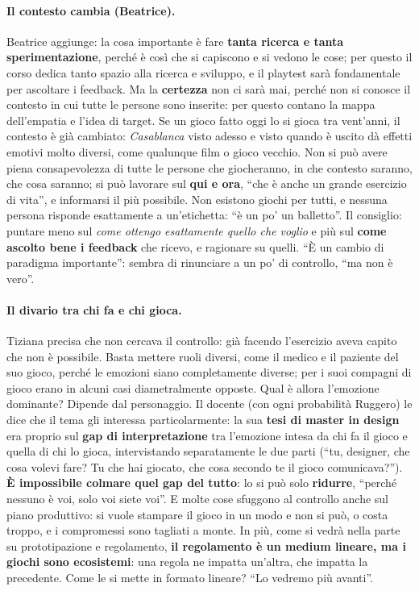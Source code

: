 \paragraph{Il contesto cambia (Beatrice).} Beatrice aggiunge: la cosa importante è
fare \textbf{tanta ricerca e tanta sperimentazione}, perché è così che si capiscono e
si vedono le cose; per questo il corso dedica tanto spazio alla ricerca e sviluppo, e il
playtest sarà fondamentale per ascoltare i feedback. Ma la \textbf{certezza} non ci
sarà mai, perché non si conosce il contesto in cui tutte le persone sono inserite: per
questo contano la mappa dell'empatia e l'idea di target. Se un gioco fatto oggi lo si
gioca tra vent'anni, il contesto è già cambiato: \emph{Casablanca} visto adesso e visto
quando è uscito dà effetti emotivi molto diversi, come qualunque film o gioco vecchio.
Non si può avere piena consapevolezza di tutte le persone che giocheranno, in che
contesto saranno, che cosa saranno; si può lavorare sul \textbf{qui e ora}, ``che è
anche un grande esercizio di vita'', e informarsi il più possibile. Non esistono giochi
per tutti, e nessuna persona risponde esattamente a un'etichetta: ``è un po' un
balletto''. Il consiglio: puntare meno sul \emph{come ottengo esattamente quello che
voglio} e più sul \textbf{come ascolto bene i feedback} che ricevo, e ragionare su
quelli. ``È un cambio di paradigma importante'': sembra di rinunciare a un po' di
controllo, ``ma non è vero''.

\paragraph{Il divario tra chi fa e chi gioca.} Tiziana precisa che non cercava il
controllo: già facendo l'esercizio aveva capito che non è possibile. Basta mettere
ruoli diversi, come il medico e il paziente del suo gioco, perché le emozioni siano
completamente diverse; per i suoi compagni di gioco erano in alcuni casi
diametralmente opposte. Qual è allora l'emozione dominante? Dipende dal personaggio.
Il docente (con ogni probabilità Ruggero) le dice che il tema gli interessa
particolarmente: la sua \textbf{tesi di master in design} era proprio sul \textbf{gap
di interpretazione} tra l'emozione intesa da chi fa il gioco e quella di chi lo gioca,
intervistando separatamente le due parti (``tu, designer, che cosa volevi fare? Tu che
hai giocato, che cosa secondo te il gioco comunicava?''). \textbf{È impossibile colmare
quel gap del tutto}: lo si può solo \textbf{ridurre}, ``perché nessuno è voi, solo voi
siete voi''. E molte cose sfuggono al controllo anche sul piano produttivo: si vuole
stampare il gioco in un modo e non si può, o costa troppo, e i compromessi sono tagliati
a monte. In più, come si vedrà nella parte su prototipazione e regolamento,
\textbf{il regolamento è un medium lineare, ma i giochi sono ecosistemi}: una regola ne
impatta un'altra, che impatta la precedente. Come le si mette in formato lineare? ``Lo
vedremo più avanti''.

